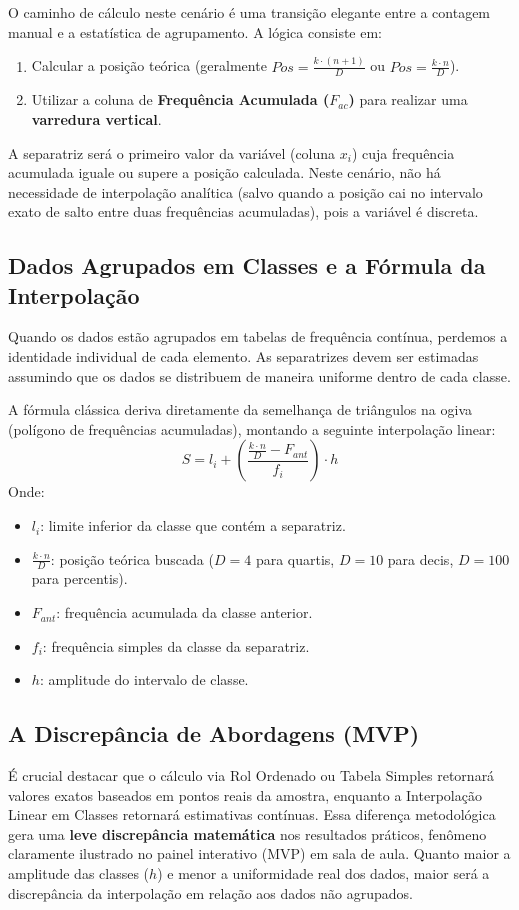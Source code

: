 \documentclass[12pt,a4paper]{article}
\begin{document}
O caminho de cálculo neste cenário é uma transição elegante entre a contagem manual e a estatística de agrupamento. A lógica consiste em:
\begin{enumerate}
    \item Calcular a posição teórica (geralmente $Pos = \frac{k \cdot (n+1)}{D}$ ou $Pos = \frac{k \cdot n}{D}$).
    \item Utilizar a coluna de \textbf{Frequência Acumulada ($F_{ac}$)} para realizar uma \textbf{varredura vertical}.
\end{enumerate}
A separatriz será o primeiro valor da variável (coluna $x_i$) cuja frequência acumulada iguale ou supere a posição calculada. Neste cenário, não há necessidade de interpolação analítica (salvo quando a posição cai no intervalo exato de salto entre duas frequências acumuladas), pois a variável é discreta.

\subsection{Dados Agrupados em Classes e a Fórmula da Interpolação}
Quando os dados estão agrupados em tabelas de frequência contínua, perdemos a identidade individual de cada elemento. As separatrizes devem ser estimadas assumindo que os dados se distribuem de maneira uniforme dentro de cada classe. 

A fórmula clássica deriva diretamente da semelhança de triângulos na ogiva (polígono de frequências acumuladas), montando a seguinte interpolação linear:
\begin{equation}
S = l_i + \left( \frac{\frac{k \cdot n}{D} - F_{ant}}{f_i} \right) \cdot h
\end{equation}
Onde:
\begin{itemize}
    \item $l_i$: limite inferior da classe que contém a separatriz.
    \item $\frac{k \cdot n}{D}$: posição teórica buscada ($D=4$ para quartis, $D=10$ para decis, $D=100$ para percentis).
    \item $F_{ant}$: frequência acumulada da classe anterior.
    \item $f_i$: frequência simples da classe da separatriz.
    \item $h$: amplitude do intervalo de classe.
\end{itemize}

\subsection{A Discrepância de Abordagens (MVP)}
É crucial destacar que o cálculo via Rol Ordenado ou Tabela Simples retornará valores exatos baseados em pontos reais da amostra, enquanto a Interpolação Linear em Classes retornará estimativas contínuas. Essa diferença metodológica gera uma \textbf{leve discrepância matemática} nos resultados práticos, fenômeno claramente ilustrado no painel interativo (MVP) em sala de aula. Quanto maior a amplitude das classes ($h$) e menor a uniformidade real dos dados, maior será a discrepância da interpolação em relação aos dados não agrupados.
\end{document}
